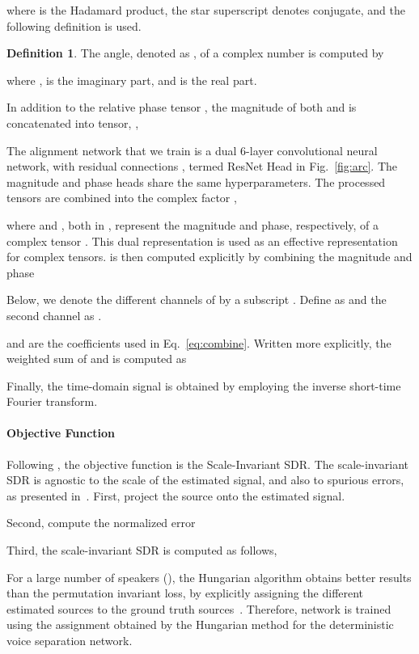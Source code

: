 \documentclass{article}
\theoremstyle{plain}
\theoremstyle{definition}
\newtheorem{definition}[theorem]{Definition}
\theoremstyle{remark}
\begin{document}
where  is the Hadamard product, the star superscript denotes conjugate, and the following definition is used.
\begin{definition}
    The angle, denoted as , of a complex number is computed by
    
    where ,  is the imaginary part, and  is the real part.
\end{definition}


In addition to the relative phase tensor , the magnitude of both  and  is concatenated into tensor, ,


The alignment network that we train  is a dual 6-layer convolutional neural network, with residual connections \cite{he2016deep}, termed ResNet Head in Fig.~\ref{fig:arc}. 
The magnitude and phase heads share the same hyperparameters. The processed tensors are combined into the complex factor ,

where  and , both in , represent the magnitude and phase, respectively, of a complex tensor . This dual representation is used as an effective representation for complex tensors.  is then computed explicitly by combining the magnitude and phase 

Below, we denote the different channels of  by a subscript . Define as  and the second channel as . 

 and  are the coefficients used in Eq.~\ref{eq:combine}. Written more explicitly, the weighted sum of  and  is computed as


Finally, the time-domain signal is obtained by employing the inverse short-time Fourier transform.



\paragraph{Objective Function}

Following  \cite{luo2019conv,subakan2021attention,sepit,scheibler2022diffusion}, the objective function is the Scale-Invariant SDR. 
The scale-invariant SDR is agnostic to the scale of the estimated signal, and also to spurious errors, as presented in~\cite{le2019sdr}.
First, project the source onto the estimated signal.

Second, compute the normalized error

Third, the scale-invariant SDR is computed as follows,


For a large number of speakers (), the Hungarian algorithm obtains better results than the permutation invariant loss, by explicitly assigning the different estimated sources to the ground truth sources~\cite{dovrat2021many}. Therefore, network  is trained using the assignment obtained by the Hungarian method for the deterministic voice separation network. 
\end{document}
